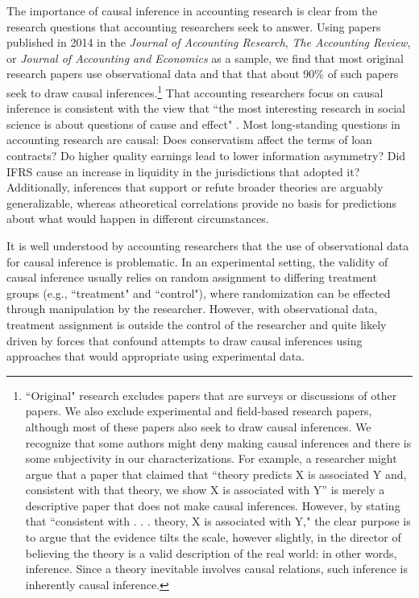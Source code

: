 \documentclass[11pt,reqno]{amsart}
\begin{document}
The importance of causal inference in accounting research is clear from the research questions that accounting researchers seek to answer. Using papers published in 2014 in the \textit{Journal of Accounting Research}, \textit{The Accounting Review}, or \textit{Journal of Accounting and Economics} as a sample, we find that most original research papers use observational data and that that about 90\% of such papers seek to draw causal inferences.\footnote{
 ``Original" research excludes papers that are surveys or discussions of other papers.
We also exclude experimental and field-based research papers, although most of these papers also seek to draw causal inferences. 
We recognize that some authors might deny making causal inferences and there is some subjectivity in our characterizations.
For example, a researcher might argue that a paper that claimed that ``theory predicts X is associated Y and, consistent with that theory, we show X is associated with Y'' is merely a descriptive paper that does not make causal inferences.
However, by stating that ``consistent with . . . theory, X is associated with Y," the clear purpose is to argue that the
evidence tilts the scale, however slightly, in the director of believing the theory is a valid description of the real world: in other words, inference.
Since a theory inevitable involves causal relations, such inference is inherently causal inference.}
That accounting researchers focus on causal inference is consistent with the view that ``the most interesting research in social science is about questions of cause and effect" \cite[p. 3]{Angrist:2008vk}.
Most long-standing questions in accounting research are causal: 
Does conservatism affect the terms of loan contracts?
Do higher quality earnings lead to lower information asymmetry? 
Did IFRS cause an increase in liquidity in the jurisdictions that adopted it?
Additionally, inferences that support or refute broader theories are arguably generalizable, whereas atheoretical correlations provide no basis for predictions about what would happen in different circumstances.

It is well understood by accounting researchers that the use of observational data for causal inference is problematic.
In an experimental setting, the validity of causal inference usually relies on random assignment to differing treatment groups (e.g., ``treatment" and ``control"), where randomization can be effected through manipulation by the researcher. %
However, with observational data, treatment assignment is outside the control of the researcher and quite likely driven by forces that confound attempts to draw causal inferences using approaches that would appropriate using experimental data.
\end{document}
